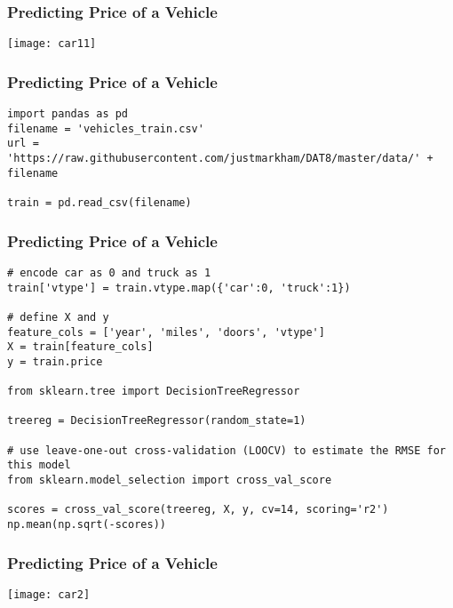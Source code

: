 \begin{frame}[fragile]\frametitle{Predicting Price of a Vehicle}

\begin{center}
\texttt{[image: car11]}
\end{center}



\end{frame}


\begin{frame}[fragile]\frametitle{Predicting Price of a Vehicle}


\begin{lstlisting}
import pandas as pd
filename = 'vehicles_train.csv'
url = 'https://raw.githubusercontent.com/justmarkham/DAT8/master/data/' + filename

train = pd.read_csv(filename)
\end{lstlisting}

\end{frame}


\begin{frame}[fragile]\frametitle{Predicting Price of a Vehicle}
\begin{lstlisting}
# encode car as 0 and truck as 1
train['vtype'] = train.vtype.map({'car':0, 'truck':1})

# define X and y
feature_cols = ['year', 'miles', 'doors', 'vtype']
X = train[feature_cols]
y = train.price

from sklearn.tree import DecisionTreeRegressor

treereg = DecisionTreeRegressor(random_state=1)

# use leave-one-out cross-validation (LOOCV) to estimate the RMSE for this model
from sklearn.model_selection import cross_val_score

scores = cross_val_score(treereg, X, y, cv=14, scoring='r2')
np.mean(np.sqrt(-scores))
\end{lstlisting}
\end{frame}


\begin{frame}[fragile]\frametitle{Predicting Price of a Vehicle}
\begin{center}
\texttt{[image: car2]}
\end{center}
\end{frame}


